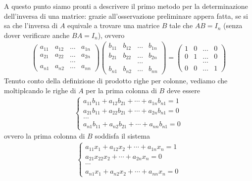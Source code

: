 A questo punto siamo pronti a descrivere il primo metodo per la
determinazione dell'inversa di una matrice: grazie all'osservazione
preliminare appera fatta, se si sa che l'inversa di $A$ equivale a
trovare una matrice $B$ tale che $AB=I_n$ (senza dover verificare
anche $BA=I_n$), ovvero
\begin{eqnarray*}
  \begin{pmatrix}
    a_{11} & a_{12} & \dots & a_{1n}\\
    a_{21} & a_{22} & \dots & a_{2n}\\
           && \dots \\
    a_{n1} & a_{n2} &\dots & a_{nn}
  \end{pmatrix}
  \begin{pmatrix}
    b_{11} & b_{12} & \dots & b_{1n}\\
    b_{21} & b_{22} & \dots & b_{2n}\\
           && \dots\\
    b_{n1} & b_{n2} & \dots & b_{nn}
  \end{pmatrix}=
  \begin{pmatrix}
    1 & 0 & \dots & 0\\
    0 & 1 & \dots & 0\\
      && \dots\\
    0 & 0 & \dots & 1
  \end{pmatrix}
\end{eqnarray*}
Tenuto conto della definizione di prodotto righe per colonne,
vediamo che moltiplcando le righe di $A$ per la prima colonna di $B$
deve essere
\begin{eqnarray*}
  \begin{cases}
    a_{11}b_{11} +a_{12}b_{21}+\cdots + a_{1n}b_{n1}=1\\
    a_{21}b_{11} +a_{22}b_{21}+\cdots + a_{2n}b_{n1}=0\\
    \dots\\
    a_{n1}b_{11}+a_{n2}b_{21}+\cdots + a_{nn}b_{n1}=0
  \end{cases}
\end{eqnarray*}
ovvero la prima colonna di $B$ soddisfa il sistema
\begin{eqnarray}
  \label{eq:Compinveeproddimatrici9}
  \begin{cases}
    a_{11}x_1+a_{12}x_2+\cdots+a_{1n}x_n=1\\
    a_{21}x_{22}x_2+\cdots +a_{2n}x_n=0\\
    \cdots\\
    a_{n1}x_1+a_{n2}x_2+\cdots+a_{nn}x_n=0
  \end{cases}
\end{eqnarray}

